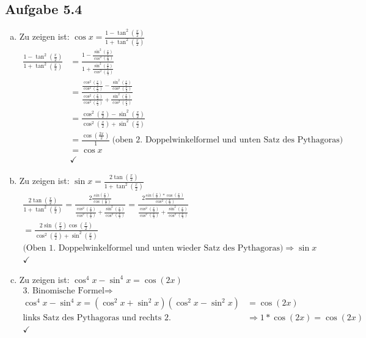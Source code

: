 \documentclass{standalone}
\begin{document}
\subsection{Aufgabe 5.4}
\begin{enumerate}[a)]
	\item Zu zeigen ist: $\cos x = \frac{1- \tan^2 (\frac{x}{2})}{1+\tan^2(\frac{x}{2})}$ \\
	\begin{align*}
		\frac{1- \tan^2 (\frac{x}{2})}{1+\tan^2(\frac{x}{2})} &= \frac{1-\frac{\sin^2(\frac{x}{2})}{\cos^2(\frac{x}{2})}}{1+\frac{\sin^2(\frac{x}{2})}{\cos^2(\frac{x}{2})}} \\
		&= \frac{\frac{\cos^2(\frac{x}{2})}{\cos^2(\frac{x}{2})} - \frac{\sin^2(\frac{x}{2})}{\cos^2(\frac{x}{2})}}{\frac{\cos^2(\frac{x}{2})}{\cos^2(\frac{x}{2})}+\frac{\sin^2(\frac{x}{2})}{\cos^2(\frac{x}{2})}} \\
		&= \frac{\cos^2(\frac{x}{2})-\sin^2(\frac{x}{2})}{\cos^2(\frac{x}{2})+\sin^2(\frac{x}{2})} \\
		&= \frac{\cos(\frac{2x}{2})}{1} \> \text{(oben 2. Doppelwinkelformel und unten Satz des Pythagoras)} \\
		&= \cos x \\ &\checkmark
	\end{align*}
	\item Zu zeigen ist: $\sin x = \frac{2\tan(\frac{x}{2})}{1+\tan^2(\frac{x}{2})}$
	\begin{align*}
		\frac{2\tan(\frac{x}{2})}{1+\tan^2(\frac{x}{2})} = \frac{2 \frac{sin(\frac{x}{2})}{\cos(\frac{x}{2})}}{\frac{\cos^2(\frac{x}{2})}{\cos^2(\frac{x}{2})} + \frac{\sin^2(\frac{x}{2})}{\cos^2(\frac{x}{2})}} = \frac{2 \frac{sin(\frac{x}{2})*\cos(\frac{x}{2})}{\cos^2(\frac{x}{2})}}{\frac{\cos^2(\frac{x}{2})}{\cos^2(\frac{x}{2})} + \frac{\sin^2(\frac{x}{2})}{\cos^2(\frac{x}{2})}} \\
		= \frac{2 \sin (\frac{x}{2}) \cos (\frac{x}{2})}{\cos^2 (\frac{x}{2}) + \sin^2 (\frac{x}{2})} \\
		\text{(Oben 1. Doppelwinkelformel und unten wieder Satz des Pythagoras)} \Rightarrow  \sin x \\
		\checkmark
	\end{align*}
	\item Zu zeigen ist: $\cos^4 x - \sin^4 x = \cos (2x)$
	\begin{align*}
		\text{3. Binomische Formel} \Rightarrow \\
		\cos^4 x - \sin^4 x = (\cos^2 x+ \sin^2 x)(\cos^2x - \sin^2 x) &= \cos (2x) \\
		\text{links Satz des Pythagoras und rechts 2. Doppelwinkelformel} &\Rightarrow 1 * \cos (2x) = \cos (2x) \\
		\checkmark
	\end{align*}
\end{enumerate}
\end{document}
